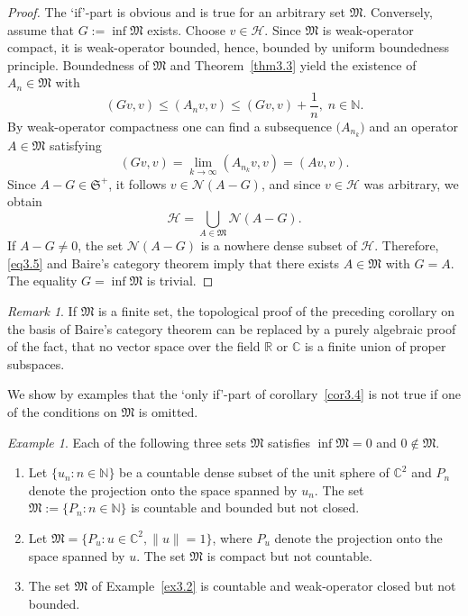 \documentclass[12pt, a4paper, reqno, twoside]{amsart}
\numberwithin{equation}{section}
\newcommand{\frakS}{\mathfrak S}
\newcommand{\frakM}{\mathfrak M}
\theoremstyle{definition}
\theoremstyle{remark}
\newtheorem{example}[theorem]{Example}
\newtheorem{remark}[theorem]{Remark}
\theoremstyle{mystyle}
\begin{document}
\begin{proof}
The `if'-part is obvious and is true for an arbitrary set $\frakM$.
Conversely, assume that $G:=\inf\frakM$ exists. Choose $v\in\mathscr
H$. Since $\frakM$ is weak-operator compact, it is weak-operator
bounded, hence, bounded by uniform boundedness principle. Boundedness
of $\frakM$ and Theorem~\ref{thm3.3} yield the existence of                             
$A_{n}\in\frakM$ with
\[
(Gv,v)\leq (A_{n}v,v)  \leq (Gv,v)+\frac{1}{n},\;n\in\mathbb N.
\]  
By weak-operator compactness one can find a subsequence
$\bigl(A_{n_{k}}\bigr)$ and an operator $A\in\frakM$ satisfying
\[
(Gv,v) = \lim_{k\to\infty}(A_{n_{k}}v,v) = (Av,v).
\]  
Since $A-G\in\frakS^{+}$, it follows $v\in\mathscr N(A-G)$, and since
$v\in\mathscr H$ was arbitrary, we obtain
\begin{equation}
\label{eq3.5}
\mathscr H = \bigcup_{A\in\frakM}\mathscr N(A-G).
\end{equation}
If $A-G\neq 0$, the set $\mathscr N(A-G)$ is a nowhere dense subset of
$\mathscr H$. Therefore, \eqref{eq3.5} and Baire's category theorem
imply that there exists $A\in\frakM$ with $G=A$. The equality
$G=\inf\frakM$ is trivial.
\end{proof}

\begin{remark}
If $\frakM$ is a finite set, the topological proof of the preceding
corollary on the basis of Baire's category theorem can be replaced by
a purely algebraic proof of the fact, that no vector space over the
field $\mathbb R$ or $\mathbb C$ is a finite union of proper subspaces.
\end{remark}

We show by examples that the `only if'-part of corollary~\ref{cor3.4}
is not true if one of the conditions on $\frakM$ is omitted.

\begin{example}
\label{ex3.5}
Each of the following three sets $\frakM$ satisfies $\inf\frakM=0$ and
$0\notin\frakM$.
\begin{enumerate}
\item[(i)]
Let $\{u_{n} : n\in\mathbb N\}$ be a countable dense subset of the
unit  sphere of $\mathbb C^{2}$ and $P_{n}$ denote the projection onto
the space spanned by $u_{n}$. The set $\frakM:=\{P_{n}:n\in\mathbb
N\}$ is countable and bounded but not closed.
\item[(ii)]
Let $\frakM=\{P_{u} : u\in\mathbb C^{2}, \|u\|=1\}$, where $P_{u}$
denote the projection onto the space spanned by $u$. The set
$\frakM$ is compact but not countable.
\item[(iii)]
The set $\frakM$ of Example~\ref{ex3.2} is countable and
weak-operator closed but not bounded.
\end{enumerate}
\end{example}
\end{document}

